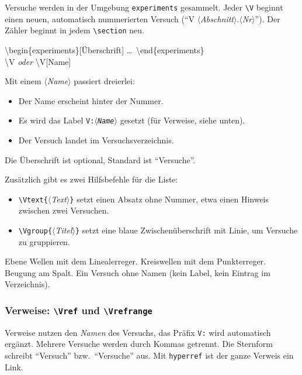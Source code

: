 \documentclass[a4paper,11pt,parskip=half]{scrartcl}
\newcommand{\cs}[1]{\texttt{\textbackslash #1}}
\newcommand{\env}[1]{\texttt{#1}}
\newcommand{\marg}[1]{\texttt{\{}\meta{#1}\texttt{\}}}
\newcommand{\meta}[1]{\ensuremath{\langle}\textit{#1}\ensuremath{\rangle}}
\begin{document}
Versuche werden in der Umgebung \env{experiments} gesammelt. Jeder \cs{V} beginnt einen
neuen, automatisch nummerierten Versuch (\enquote{V \meta{Abschnitt}.\meta{Nr}}).
Der Zähler beginnt in jedem \cs{section} neu.

\begin{befehl}{\textbackslash begin\{experiments\}[Überschrift] \dots\ \textbackslash end\{experiments\}\\
\textbackslash V \quad \textit{oder} \quad \textbackslash V[Name]}\end{befehl}

Mit einem \meta{Name} passiert dreierlei:
\begin{itemize}
  \item Der Name erscheint hinter der Nummer.
  \item Es wird das Label \texttt{V:\meta{Name}} gesetzt (für Verweise, siehe unten).
  \item Der Versuch landet im Versuchsverzeichnis.
\end{itemize}
Die Überschrift ist optional, Standard ist \enquote{Versuche}.

Zusätzlich gibt es zwei Hilfsbefehle für die Liste:
\begin{itemize}
  \item \cs{Vtext}\marg{Text} setzt einen Absatz ohne Nummer, etwa einen Hinweis zwischen zwei Versuchen.
  \item \cs{Vgroup}\marg{Titel} setzt eine blaue Zwischenüberschrift mit Linie, um Versuche zu gruppieren.
\end{itemize}

\begin{beispiel}
\begin{experiments}
   Ebene Wellen mit dem Linealerreger.
   Kreiswellen mit dem Punkterreger.
   Beugung am Spalt.
  \V Ein Versuch ohne Namen (kein Label, kein Eintrag im Verzeichnis).
\end{experiments}
\end{beispiel}

\subsubsection*{Verweise: \cs{Vref} und \cs{Vrefrange}}

Verweise nutzen den \emph{Namen} des Versuchs, das Präfix \texttt{V:} wird automatisch
ergänzt. Mehrere Versuche werden durch Kommas getrennt. Die Sternform schreibt
\enquote{Versuch} bzw.\ \enquote{Versuche} aus. Mit \texttt{hyperref} ist der ganze Verweis ein Link.
\end{document}
